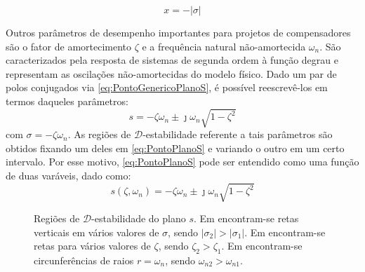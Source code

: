 \begin{equation}
  x = -|\sigma|\label{eq:Sigma}
\end{equation}

Outros parâmetros de desempenho importantes para projetos de compensadores são o fator de amortecimento $\zeta$ e a frequência natural não-amortecida $\omega_n$. São caracterizados pela resposta de sistemas de segunda ordem à função degrau \cite{NISE2011}\cite{OGATA2011} e representam as oscilações não-amortecidas do modelo físico. Dado um par de polos conjugados via \eqref{eq:PontoGenericoPlanoS}, é possível reescrevê-los em termos daqueles parâmetros:
\begin{equation}
  s = -\zeta\omega_n \pm \jmath\omega_n \sqrt {1-\zeta^2} \label{eq:PontoPlanoS}
\end{equation}
com $\sigma = -\zeta\omega_n$. As regiões de $\mathscr{D}$-estabilidade referente a tais parâmetros são obtidos fixando um deles em \eqref{eq:PontoPlanoS} e variando o outro em um certo intervalo. Por esse motivo, \eqref{eq:PontoPlanoS} pode ser entendido como uma função de duas varáveis, dado como:
\begin{equation}
  s(\zeta,\omega_n) = -\zeta\omega_n \pm \jmath\omega_n \sqrt {1-\zeta^2} \label{eq:FuncaoPontoPlanoS}
\end{equation}

\begin{figure}[!ht]
  \centering
  \begin{subfigure}[t]{0.3\columnwidth}
      
      \caption{}
      \label{subfig:EstabilidadeRelativaS}
  \end{subfigure}
  \begin{subfigure}[t]{0.3\columnwidth}
      
      \caption{}
      \label{subfig:TaxaDeAmortecimentoS}
  \end{subfigure}
  \begin{subfigure}[t]{0.35\columnwidth}
    
    \caption{}
    \label{subfig:OscilacaoNaoAmortecidaS}
  \end{subfigure}
  \caption{Regiões de $\mathscr{D}$-estabilidade do plano $s$. Em  encontram-se retas verticais em vários valores de $\sigma$, sendo $|\sigma_2| > |\sigma_1|$. Em  encontram-se retas para vários valores de $\zeta$, sendo $\zeta_2 > \zeta_1$. Em  encontram-se circunferências de raios $r = \omega_n$, sendo $\omega_{n2} > \omega_{n1}$.}
  \label{fig:RegioesPlanoS}
\end{figure}

